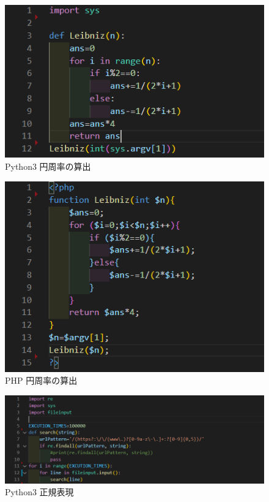 \begin{figure}[tb]
    \centering
    \includegraphics[width=13.5cm,keepaspectratio]{figure/p-py.PNG}
    \caption{Python3 円周率の算出}
    \label{fig:p-py}
\end{figure}

\begin{figure}[tb]
    \centering
    \includegraphics[width=13.5cm,keepaspectratio]{figure/p-php.PNG}
    \caption{PHP 円周率の算出}
    \label{fig:p-php}
\end{figure}
\begin{figure}[tb]
    \centering
        \includegraphics[width=13.5cm,keepaspectratio]{figure/s-py.PNG}
        \caption{Python3 正規表現}
        \label{fig:s-py}
\end{figure}

